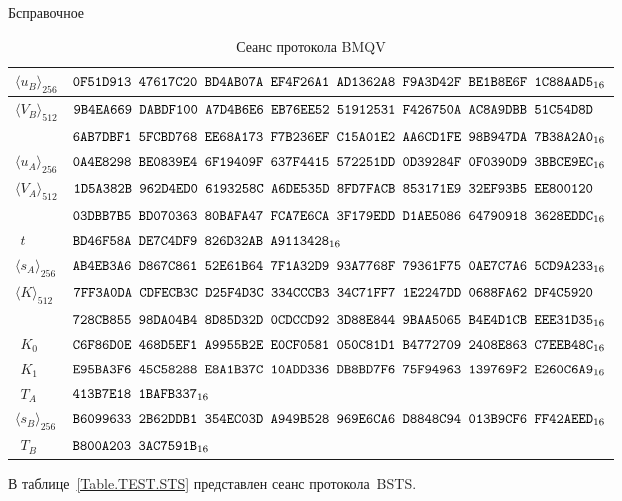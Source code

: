 \begin{appendix}{Б}{справочное}
\begin{table}[H]
\caption{Сеанс протокола BMQV}\label{Table.TEST.MQV}
{\small
\begin{tabular}{|l|l|}
\hline
$\langle u_B\rangle_{256}$ & 
$\texttt{0F51D913~47617C20~BD4AB07A~EF4F26A1~AD1362A8~F9A3D42F~BE1B8E6F~1C88AAD5}_{16}$\\
%
\hline
$\langle V_B\rangle_{512}$ & 
$\texttt{9B4EA669~DABDF100~A7D4B6E6~EB76EE52~51912531~F426750A~AC8A9DBB~51C54D8D}$\\
&
$\texttt{6AB7DBF1~5FCBD768~EE68A173~F7B236EF~C15A01E2~AA6CD1FE~98B947DA~7B38A2A0}_{16}$\\
%
\hline
\hline
$\langle u_A\rangle_{256}$ & 
$\texttt{0A4E8298~BE0839E4~6F19409F~637F4415~572251DD~0D39284F~0F0390D9~3BBCE9EC}_{16}$\\
%
\hline
$\langle V_A\rangle_{512}$ & 
$\texttt{1D5A382B~962D4ED0~6193258C~A6DE535D~8FD7FACB~853171E9~32EF93B5~EE800120}$\\
&
$\texttt{03DBB7B5~BD070363~80BAFA47~FCA7E6CA~3F179EDD~D1AE5086~64790918~3628EDDC}_{16}$\\
%
\hline
$\phantom{\langle}t$ & 
$\texttt{BD46F58A~DE7C4DF9~826D32AB~A9113428}_{16}$\\
%
\hline
$\langle s_A\rangle_{256}$ & 
$\texttt{AB4EB3A6~D867C861~52E61B64~7F1A32D9~93A7768F~79361F75~0AE7C7A6~5CD9A233}_{16}$\\
%
\hline
$\langle K\rangle_{512}$ & 
$\texttt{7FF3A0DA~CDFECB3C~D25F4D3C~334CCCB3~34C71FF7~1E2247DD~0688FA62~DF4C5920}$\\
&
$\texttt{728CB855~98DA04B4~8D85D32D~0CDCCD92~3D88E844~9BAA5065~B4E4D1CB~EEE31D35}_{16}$\\
%
\hline
$\phantom{\langle}K_0$ & 
$\texttt{C6F86D0E~468D5EF1~A9955B2E~E0CF0581~050C81D1~B4772709~2408E863~C7EEB48C}_{16}$\\
%
\hline
$\phantom{\langle}K_1$ & 
$\texttt{E95BA3F6~45C58288~E8A1B37C~10ADD336~DB8BD7F6~75F94963~139769F2~E260C6A9}_{16}$\\
%
\hline
$\phantom{\langle}T_A$ & 
$\texttt{413B7E18~1BAFB337}_{16}$\\
%
\hline
\hline
%
$\langle s_B\rangle_{256}$ & 
$\texttt{B6099633~2B62DDB1~354EC03D~A949B528~969E6CA6~D8848C94~013B9CF6~FF42AEED}_{16}$\\
%
\hline
$\phantom{\langle}T_B$ & 
$\texttt{B800A203~3AC7591B}_{16}$\\
\hline
\end{tabular}
}
\end{table}

\label{TEST.STS}

В таблице~\ref{Table.TEST.STS} представлен сеанс протокола~BSTS.


\end{appendix}
